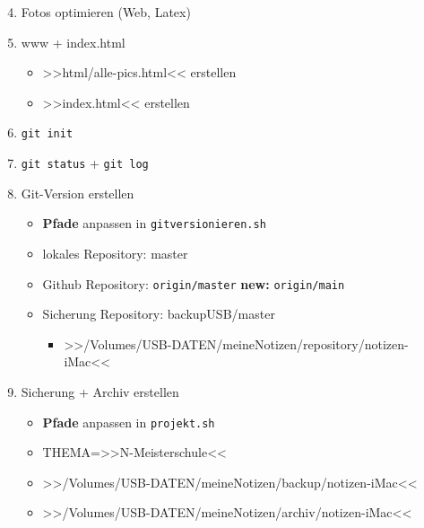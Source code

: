 \begin{enumerate}
\setcounter{enumi}{3}
\item
  Fotos optimieren (Web, Latex)
\item
  www + index.html

  \begin{itemize}
  \item
    >>html/alle-pics.html<< erstellen
  \item
    >>index.html<< erstellen
  \end{itemize}
\item
  \verb|git init|
\item
  \verb|git status| +
  \verb|git log|
\item
  Git-Version erstellen

  \begin{itemize}
  \item
    \textbf{Pfade} anpassen in
    \verb|gitversionieren.sh|
  \item
    lokales Repository: master
  \item
    Github Repository: \verb|origin/master|
    \textbf{new:} \verb|origin/main|
  \item
    Sicherung Repository: backupUSB/master

    \begin{itemize}
    \item
      >>/Volumes/USB-DATEN/meineNotizen/repository/notizen-iMac<<
    \end{itemize}
  \end{itemize}
\item
  Sicherung + Archiv erstellen

  \begin{itemize}
  \item
    \textbf{Pfade} anpassen in \verb|projekt.sh|
  \item
    THEMA=>>N-Meisterschule<<
  \item
    >>/Volumes/USB-DATEN/meineNotizen/backup/notizen-iMac<<
  \item
    >>/Volumes/USB-DATEN/meineNotizen/archiv/notizen-iMac<<
  \end{itemize}
\end{enumerate}
